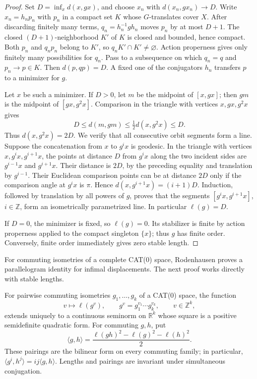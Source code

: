 \begin{proof}
Set $D=\inf_xd(x,gx)$, and choose $x_n$ with
$d(x_n,gx_n)\to D$.  Write $x_n=h_n p_n$ with $p_n$ in a compact set $K$
whose $G$-translates cover $X$.  After discarding finitely many terms,
$q_n=h_n^{-1}gh_n$ moves $p_n$ by at most $D+1$.  The closed
$(D+1)$-neighborhood $K'$ of $K$ is closed and bounded, hence compact.
Both $p_n$ and $q_np_n$ belong to $K'$, so $q_nK'\cap K'\ne\varnothing$.
Action properness gives only finitely many possibilities for $q_n$.
Pass to a subsequence on which $q_n=q$ and $p_n\to p\in K$.  Then
$d(p,qp)=D$.  A fixed one of the conjugators $h_n$ transfers $p$ to a
minimizer for $g$.

Let $x$ be such a minimizer.  If $D>0$, let $m$ be the midpoint of
$[x,gx]$; then $gm$ is the midpoint of $[gx,g^2x]$.  Comparison in the
triangle with vertices $x,gx,g^2x$ gives
\[
 D\le d(m,gm)\le \tfrac12 d(x,g^2x)\le D.
\]
Thus $d(x,g^2x)=2D$.  We verify that all consecutive orbit segments form
a line.  Suppose the concatenation from $x$ to $g^i x$ is geodesic.
In the triangle with vertices $x,g^i x,g^{i+1}x$, the points at distance
$D$ from $g^i x$ along the two incident sides are $g^{i-1}x$ and
$g^{i+1}x$.  Their distance is $2D$, by the preceding equality and
translation by $g^{i-1}$.  Their Euclidean comparison points can be at
distance $2D$ only if the comparison angle at $g^i x$ is $\pi$.
Hence $d(x,g^{i+1}x)=(i+1)D$.  Induction, followed by translation by
all powers of $g$, proves that the segments $[g^i x,g^{i+1}x]$,
$i\in\mathbb Z$, form an isometrically parametrized line.  In particular
$\ell(g)=D$.

If $D=0$, the minimizer is fixed, so $\ell(g)=0$.  Its stabilizer is finite
by action properness applied to the compact singleton $\{x\}$; thus $g$
has finite order.  Conversely, finite order immediately gives zero
stable length.
\end{proof}

For commuting isometries of a complete CAT(0) space, Rodenhausen
\cite[Theorem~14.6]{Rodenhausen2013} proves a parallelogram identity
for infimal displacements.  The next proof works directly with stable
lengths.

\begin{lemma}\label{lem:commuting-form}
For pairwise commuting isometries $g_1,\ldots,g_k$ of a CAT(0) space,
the function
\[
 v\longmapsto \ell(g^v),\qquad
 g^v=g_1^{v_1}\cdots g_k^{v_k},\qquad v\in\mathbb Z^k,
\]
extends uniquely to a continuous seminorm on $\mathbb R^k$ whose square
is a positive semidefinite quadratic form.  For commuting $g,h$, put
\begin{equation}\label{eq:pairing-definition}
 \langle g,h\rangle
   =\frac{\ell(gh)^2-\ell(g)^2-\ell(h)^2}{2}.
\end{equation}
These pairings are the bilinear form on every commuting family; in
particular, $\langle g^i,h^j\rangle=ij\langle g,h\rangle$.  Lengths and
pairings are invariant under simultaneous conjugation.
\end{lemma}

